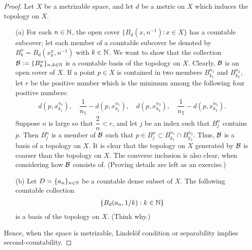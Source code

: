 \begin{proof}
    Let $X$ be a metrizable space, and let $d$ be a metric on $X$ which induces the topology on $X$.
    \begin{enumerate}
        \item[(a)]
        {
            For each $n\in{\mathbb{N}}$, the open cover $\{B_d\left(x, n^{-1}\right): x\in X\}$ has a countable subcover; let each member of a countable subcover be denoted by $B_k^n=B_d(x_k^n, n^{-1})$ with $k\in{\mathbb{N}}$.
            We want to show that the collection ${\mathcal{B}}:=\{B_k^n\}_{n, k\in{\mathbb{N}}}$ is a countable basis of the topology on $X$.
            Clearly, ${\mathcal{B}}$ is an open cover of $X$.
            If a point $p\in X$ is contained in two members $B_{k_1}^{n_1}$ and $B_{k_2}^{n_2}$, let $r$ be the positive number which is the minimum among the following four positive numbers:
            \begin{align*}
                d(p, x_{k_1}^{n_1}),\quad\dfrac{1}{n_1}-d(p, x_{k_1}^{n_1}),\quad d(p, x_{k_2}^{n_2}),\quad\dfrac{1}{n_2}-d(p, x_{k_2}^{n_2}).
            \end{align*}
            Suppose $n$ is large so that $\dfrac{2}{n}<r$, and let $j$ be an index such that $B_j^n$ contains $p$.
            Then $B_j^n$ is a member of ${\mathcal{B}}$ such that $p\in B_j^n\subset B_{k_1}^{n_1}\cap B_{k_2}^{n_2}$.
            Thus, ${\mathcal{B}}$ is a basis of a topology on $X$.
            It is clear that the topology on $X$ generated by ${\mathcal{B}}$ is coarser than the topology on $X$.
            The converse inclusion is also clear, when considering how ${\mathcal{B}}$ consists of. \color{brown}(Proving details are left as an exercise.)\color{brown}
        }
        \item[(b)]
        {
            Let $D=\{a_n\}_{n\in{\mathbb{N}}}$ be a countable dense subset of $X$.
            The following countable collection
            \begin{align*}
                \left\{B_d(a_n, 1/k): k\in{\mathbb{N}}\right\}
            \end{align*}
            is a basis of the topology on $X$. \color{brown}(Think why.)\color{black}
        }
    \end{enumerate}
    Hence, when the space is metrizable, Lindel\"{o}f condition or separability implies second-countability.
\end{proof}

